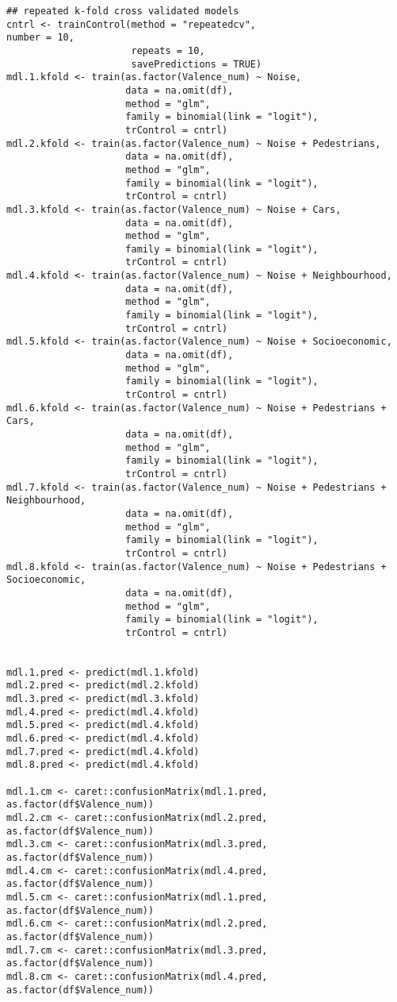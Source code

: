 \documentclass[11pt]{article}
\begin{document}
\begin{verbatim}
## repeated k-fold cross validated models
cntrl <- trainControl(method = "repeatedcv",                      number = 10,
                      repeats = 10,
                      savePredictions = TRUE)
mdl.1.kfold <- train(as.factor(Valence_num) ~ Noise,
                     data = na.omit(df),
                     method = "glm",
                     family = binomial(link = "logit"),
                     trControl = cntrl)
mdl.2.kfold <- train(as.factor(Valence_num) ~ Noise + Pedestrians,
                     data = na.omit(df),
                     method = "glm",
                     family = binomial(link = "logit"),
                     trControl = cntrl)
mdl.3.kfold <- train(as.factor(Valence_num) ~ Noise + Cars,
                     data = na.omit(df),
                     method = "glm",
                     family = binomial(link = "logit"),
                     trControl = cntrl)
mdl.4.kfold <- train(as.factor(Valence_num) ~ Noise + Neighbourhood,
                     data = na.omit(df),
                     method = "glm",
                     family = binomial(link = "logit"),
                     trControl = cntrl)
mdl.5.kfold <- train(as.factor(Valence_num) ~ Noise + Socioeconomic,
                     data = na.omit(df),
                     method = "glm",
                     family = binomial(link = "logit"),
                     trControl = cntrl)
mdl.6.kfold <- train(as.factor(Valence_num) ~ Noise + Pedestrians + Cars,
                     data = na.omit(df),
                     method = "glm",
                     family = binomial(link = "logit"),
                     trControl = cntrl)
mdl.7.kfold <- train(as.factor(Valence_num) ~ Noise + Pedestrians + Neighbourhood,
                     data = na.omit(df),
                     method = "glm",
                     family = binomial(link = "logit"),
                     trControl = cntrl)
mdl.8.kfold <- train(as.factor(Valence_num) ~ Noise + Pedestrians + Socioeconomic,
                     data = na.omit(df),
                     method = "glm",
                     family = binomial(link = "logit"),
                     trControl = cntrl)


mdl.1.pred <- predict(mdl.1.kfold)
mdl.2.pred <- predict(mdl.2.kfold)
mdl.3.pred <- predict(mdl.3.kfold)
mdl.4.pred <- predict(mdl.4.kfold)
mdl.5.pred <- predict(mdl.4.kfold)
mdl.6.pred <- predict(mdl.4.kfold)
mdl.7.pred <- predict(mdl.4.kfold)
mdl.8.pred <- predict(mdl.4.kfold)

mdl.1.cm <- caret::confusionMatrix(mdl.1.pred, as.factor(df$Valence_num))
mdl.2.cm <- caret::confusionMatrix(mdl.2.pred, as.factor(df$Valence_num))
mdl.3.cm <- caret::confusionMatrix(mdl.3.pred, as.factor(df$Valence_num))
mdl.4.cm <- caret::confusionMatrix(mdl.4.pred, as.factor(df$Valence_num))
mdl.5.cm <- caret::confusionMatrix(mdl.1.pred, as.factor(df$Valence_num))
mdl.6.cm <- caret::confusionMatrix(mdl.2.pred, as.factor(df$Valence_num))
mdl.7.cm <- caret::confusionMatrix(mdl.3.pred, as.factor(df$Valence_num))
mdl.8.cm <- caret::confusionMatrix(mdl.4.pred, as.factor(df$Valence_num))



\end{verbatim}
\end{document}
